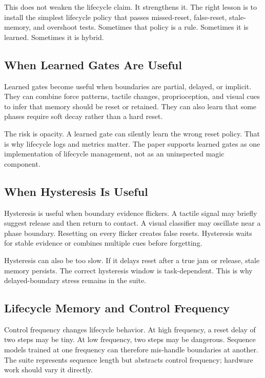 \documentclass{article}
\begin{document}
This does not weaken the lifecycle claim. It strengthens it. The right lesson
is to install the simplest lifecycle policy that passes missed-reset,
false-reset, stale-memory, and overshoot tests. Sometimes that policy is a
rule. Sometimes it is learned. Sometimes it is hybrid.

\subsection{When Learned Gates Are Useful}

Learned gates become useful when boundaries are partial, delayed, or implicit.
They can combine force patterns, tactile changes, proprioception, and visual
cues to infer that memory should be reset or retained. They can also learn that
some phases require soft decay rather than a hard reset.

The risk is opacity. A learned gate can silently learn the wrong reset policy.
That is why lifecycle logs and metrics matter. The paper supports learned gates
as one implementation of lifecycle management, not as an uninspected magic
component.

\subsection{When Hysteresis Is Useful}

Hysteresis is useful when boundary evidence flickers. A tactile signal may
briefly suggest release and then return to contact. A visual classifier may
oscillate near a phase boundary. Resetting on every flicker creates false
resets. Hysteresis waits for stable evidence or combines multiple cues before
forgetting.

Hysteresis can also be too slow. If it delays reset after a true jam or release,
stale memory persists. The correct hysteresis window is task-dependent. This is
why delayed-boundary stress remains in the suite.

\subsection{Lifecycle Memory and Control Frequency}

Control frequency changes lifecycle behavior. At high frequency, a reset delay
of two steps may be tiny. At low frequency, two steps may be dangerous. Sequence
models trained at one frequency can therefore mis-handle boundaries at another.
The suite represents sequence length but abstracts control frequency; hardware
work should vary it directly.
\end{document}
